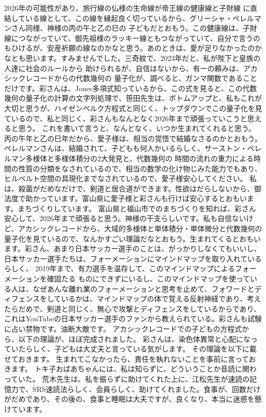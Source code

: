 \documentclass{jsarticle}
\begin{document}
2026年の可能性があり、旅行線の仏様の生命線が帝王線の健康線と子財線
に直結している線として、この線を縁起良く切っているから、グリーシャ・ペレルマンさん同様、神様の丙の午と乙の巳の
子どもだとおもう。この健康線は、子財線につながっていて、御先祖様のラッキー線ともつながっていて、自分で言うのもひけるが、安産祈願の線なのかなと思う。あのときは、愛が足りなかったのかなとも思います。すみませんでした。三奇紋で、2023年だと、私が陛下と皇族の人達に社会のルールから
助けられるが、自信はないから、有一の頼みは、アカシックレコードからの代数幾何の
量子化が、調べると、ガンマ関数であることだけです。彩さんは、Jones多項式知っているから、この式を見ると、この代数幾何の量子化の計算の文字列処理で、笹田先生は、ボトムアップと、私もこれが大切と思うが、ハイゼンベルク方程式と同じく、トップダウンでこの量子化を見ているので、私と同じく、彩さんもなんとなく2026年まで頑張っていこうと思えると思う。
これを書いて言うと、なんとなく、いつか生まれてくれると思う。丙の午年と乙の巳年だから、愛子様は、相当の覚悟で結婚なさるのかとおもう。ペレルマンさんは、結婚されて、子どもも何人かいるらしく、サーストン・ペレルマン多様体と多様体積分の2大発見と、代数幾何の
時間の流れの重力による時間の性質の分類をなされているので、相当の数学の化け物じみた能力でもあり、ヒルベルト空間の具現化までなされているので、愛子様安心してください。
私は、殺菌がだめなだけで、剣道と居合道ができます。性欲はだらしないから、御法度で助かっています。富山県に愛子様と彩さんも行けば安心するとおもいます。まちづくりしています。
富山県と福山市でのまちづくりを知れば、彩さん安心して、2026年まで頑張ると思う。神様の干支らしいです。私も自信ないけど、アカシックレコードから、大域的多様体と単体積分・単体微分と代数幾何の量子化を見ているので、なんかすごい理論だなとおもう。生まれてくるとおもいます。彩さん、あまり日本サッカー選手のことは、がっかりしなくてもいいし、
日本サッカー選手たちは、フォーメーションにマインドマップを取り入れているらしく、
2019年まで、有力選手を温存して、このマインドマップによるフォーメーションを確固たる
ものにできずにいるし、このマインドマップを使っている人は、なぜあんな離れ業のフォーメーションと思考を止めて、フォワードとディフェンスをしているかは、マインドマップの体で覚える反射神経であり、考えたらだめで、剣道と同じく、無心で攻撃とディフェンスをしているからであり、これはYouTubeの日本サッカー選手のファンから教えられている。彩さんも試験に占い禁物です。油断大敵です。
アカシックレコードでの子どもの方程式から、以下の理論が、ほぼ完成されました。
彩さんは、染色体異常と心配になっていたらしく、子どもは大丈夫と言っている気がします。
その理論を以下に載せておきます。
生まれてこなかったら、責任を執れないことを事前に言っておきます。
トキ子おばあちゃんには、私は知らずに、どういうことか音読に関わっていた。
荒木先生は、私を振らずに助けてくれた上に、江松先生が速読の記憶力で、SRS速読法らしく、会員らしく、助けてくれました。食事が、回数だけがだめであり、その後の、食事と睡眠は大夫ですが、良くなり、本当に迷惑を懸けています。
\end{document}

